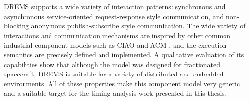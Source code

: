 DREMS supports a wide variety of interaction patterns: synchronous and asynchronous service-oriented request-response style communication, and non-blocking anonymous publish-subscribe style communication. The wide variety of interactions and communication mechanisms are inspired by other common industrial component models such as CIAO \cite{CIAO_Chap:04} and ACM \cite{ACM_SPE:10}, and the execution semantics are precisely defined and implemented. A qualitative evaluation of its capabilities \cite{ISIS_F6_ISORC:13} show that although the model was designed for fractionated spacecraft, DREMS is suitable for a variety of distributed and embedded environments. All of these properties make this component model very generic and a suitable target for the timing analysis work presented in this thesis. 


